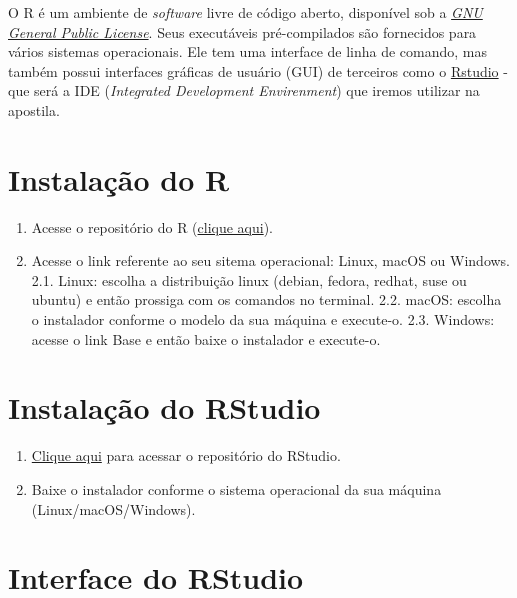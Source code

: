 \documentclass[
]{book}
\providecommand{\tightlist}{%
  \setlength{\itemsep}{0pt}\setlength{\parskip}{0pt}}
\begin{document}
O R é um ambiente de \emph{software} livre de código aberto, disponível sob a \href{https://en.wikipedia.org/wiki/GNU_General_Public_License}{\emph{GNU General Public License}}. Seus executáveis pré-compilados são fornecidos para vários sistemas operacionais. Ele tem uma interface de linha de comando, mas também possui interfaces gráficas de usuário (GUI) de terceiros como o \href{https://posit.co/download/rstudio-desktop/}{Rstudio} - que será a IDE (\emph{Integrated Development Envirenment}) que iremos utilizar na apostila.

\hypertarget{instalauxe7uxe3o-do-r}{%
\section{Instalação do R}\label{instalauxe7uxe3o-do-r}}

\begin{enumerate}
\def\labelenumi{\arabic{enumi}.}
\tightlist
\item
  Acesse o repositório do R (\href{https://cran-r.c3sl.ufpr.br/}{clique aqui}).
\item
  Acesse o link referente ao seu sitema operacional: Linux, macOS ou Windows.
  2.1. Linux: escolha a distribuição linux (debian, fedora, redhat, suse ou ubuntu) e então prossiga com os comandos no terminal.
  2.2. macOS: escolha o instalador conforme o modelo da sua máquina e execute-o.
  2.3. Windows: acesse o link Base e então baixe o instalador e execute-o.
\end{enumerate}

\hypertarget{instalauxe7uxe3o-do-rstudio}{%
\section{Instalação do RStudio}\label{instalauxe7uxe3o-do-rstudio}}

\begin{enumerate}
\def\labelenumi{\arabic{enumi}.}
\tightlist
\item
  \href{https://posit.co/download/rstudio-desktop/}{Clique aqui} para acessar o repositório do RStudio.
\item
  Baixe o instalador conforme o sistema operacional da sua máquina (Linux/macOS/Windows).
\end{enumerate}

\hypertarget{interface-do-rstudio}{%
\section{Interface do RStudio}\label{interface-do-rstudio}}
\end{document}
